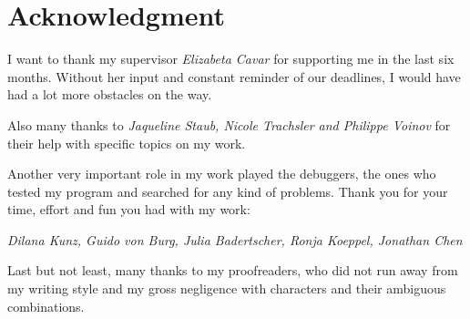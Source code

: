 
\chapter*{Acknowledgment}
I want to thank my supervisor \textit{Elizabeta Cavar} for supporting me in the last six months.
Without her input and constant reminder of our deadlines, I would have had a lot more obstacles on the way.

Also many thanks to \textit{Jaqueline Staub, Nicole Trachsler and Philippe Voinov} for their help with specific topics on my work.

Another very important role in my work played the debuggers, the ones who tested my program and searched for any kind of problems.
Thank you for your time, effort and fun you had with my work:

\textit{Dilana Kunz, Guido von Burg, Julia Badertscher, Ronja Koeppel, Jonathan Chen}

Last but not least, many thanks to my proofreaders, who did not run away from my writing style and my gross negligence
with characters and their ambiguous combinations.
